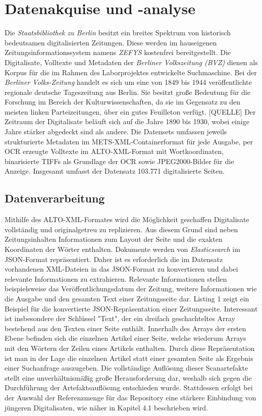 \documentclass[11pt,a4paper, halfparskip]{scrartcl}
\begin{document}
\section{Datenakquise und -analyse}

Die \textit{Staatsbibliothek zu Berlin} besitzt ein breites Spektrum von historisch bedeutsamen digitalisierten Zeitungen.
Diese werden im hauseigenen Zeitungsinformationssystem namens \textit{ZEFYS} kostenfrei bereitgestellt.
Die Digitalisate, Volltexte und Metadaten der \textit{Berliner Volkszeitung (BVZ)} dienen als Korpus für die im Rahmen des Laborprojektes entwickelte Suchmaschine.
Bei der \textit{Berliner Volks-Zeitung} handelt es sich um eine von 1849 bis 1944 veröffentlichte regionale deutsche Tageszeitung aus Berlin.
Sie besitzt große Bedeutung für die Forschung im Bereich der Kulturwissenschaften, da sie im Gegensatz zu den meisten linken Parteizeitungen, über ein gutes Feuilleton verfügt. [QUELLE]
Der Zeitraum der Digitalisate beläuft sich auf die Jahre 1890 bis 1930, wobei einige Jahre stärker abgedeckt sind als andere.
Die Datensets umfassen jeweils strukturierte Metadaten im METS-XML-Containerformat für jede Ausgabe, per OCR erzeugte Volltexte im ALTO-XML-Format mit Wortkoordinaten, binarisierte TIFFs als Grundlage der OCR sowie JPEG2000-Bilder für die Anzeige.
Insgesamt umfasst der Datensatz 103.771 digitalisierte Seiten.

\subsection{Datenverarbeitung}

Mithilfe des ALTO-XML-Formates wird die Möglichkeit geschaffen Digitalisate vollständig und originalgetreu zu replizieren. 
Aus diesem Grund sind neben Zeitungsinhalten Informationen zum Layout der Seite und die exakten Koordinaten der Wörter enthalten.
Dokumente werden von \textit{Elasticsearch} im JSON-Format repräsentiert.
Daher ist es erforderlich die im Datensatz vorhandenen XML-Dateien in das JSON-Format zu konvertieren und dabei relevante Informationen zu extrahieren.
Relevante Informationen stellen beispielsweise das Veröffentlichungsdatum der Zeitung, weitere Informationen wie die Ausgabe und den gesamten Text einer Zeitungsseite dar.
Listing 1 zeigt ein Beispiel für die konvertierte JSON-Repräsentation einer Zeitungsseite.
Interessant ist insbesondere der Schlüssel "Text", der ein dreifach geschachteltes Array bestehend aus den Texten einer Seite enthält.
Innerhalb des Arrays der ersten Ebene befinden sich die einzelnen Artikel einer Seite, welche wiederum Arrays mit den Wörtern der Zeilen eines Artikels enthalten.
Durch diese Repräsentation ist man in der Lage die einzelnen Artikel statt einer gesamten Seite als Ergebnis einer Suchanfrage auszugeben.
Die vollständige Auflösung dieser Scanartefakte stellt eine unverhältnismäßig große Herausforderung dar, weshalb sich gegen die Durchführung der Artefaktsauflösung entschieden wurde. 
Stattdessen erfolgt bei der Auswahl der Referenzmenge für das Repository eine stärkere Einbindung von jüngeren Digitalisaten, wie näher in Kapitel 4.1 beschrieben wird.
\end{document}
